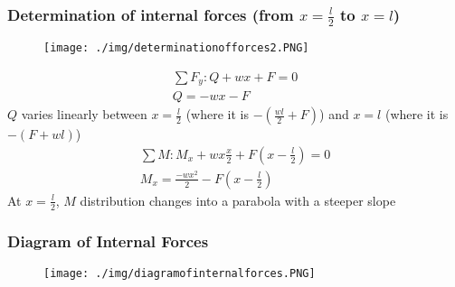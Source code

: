 \subsubsection{Determination of internal forces (from $x=\frac{l}{2}$ to $x=l$)}
\begin{figure}[H]
  \centering
  \texttt{[image: ./img/determinationofforces2.PNG]}
\end{figure}
\begin{gather}
  \sum F_y: Q + wx + F = 0 \\
  Q = -wx -F
\end{gather}
$Q$ varies linearly between $x=\frac{l}{2}$ (where it is $-(\frac{wl}{2}+F)$) and $x=l$ (where it is $-(F+wl)$)
\begin{gather}
  \sum M: M_x + wx\frac{x}{2} + F(x-\frac{l}{2})= 0 \\
  M_x = \frac{-wx^2}{2} - F(x-\frac{l}{2})
\end{gather}
At $x=\frac{l}{2}$, $M$ distribution changes into a parabola with a steeper slope
\subsubsection{Diagram of Internal Forces}
\begin{figure}[H]
  \centering
  \texttt{[image: ./img/diagramofinternalforces.PNG]}
\end{figure}